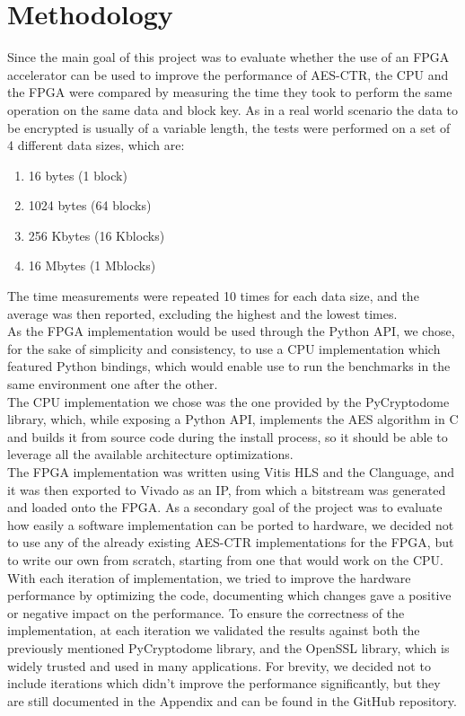 \documentclass[12pt,oneside,a4paper]{article}
\def\CC{{C\nolinebreak[4]\hspace{-.05em}\raisebox{.4ex}{\tiny\bf ++}}}
\begin{document}
\section{Methodology} \label{sec:methodology}
Since the main goal of this project was to evaluate whether the use of an FPGA accelerator can be used to improve the performance of AES-CTR, the CPU and the FPGA were compared by measuring the time they took to perform the same operation on the same data and block key.
As in a real world scenario the data to be encrypted is usually of a variable length, the tests were performed on a set of 4 different data sizes, which are:
\begin{enumerate}
	\item 16 bytes (1 block)
	\item 1024 bytes (64 blocks)
	\item 256 Kbytes (16 Kblocks)
	\item 16 Mbytes (1 Mblocks)
\end{enumerate}
The time measurements were repeated 10 times for each data size, and the average was then reported, excluding the highest and the lowest times.
\\As the FPGA implementation would be used through the Python API, we chose, for the sake of simplicity and consistency, to use a CPU implementation which featured Python bindings, which would enable use to run the benchmarks in the same environment one after the other.
\\The CPU implementation we chose was the one provided by the PyCryptodome library, which, while exposing a Python API, implements the AES algorithm in C and builds it from source code during the install process, so it should be able to leverage all the available architecture optimizations.
\\The FPGA implementation was written using Vitis HLS and the \CC language, and it was then exported to Vivado as an IP, from which a bitstream was generated and loaded onto the FPGA.
As a secondary goal of the project was to evaluate how easily a software implementation can be ported to hardware, we decided not to use any of the already existing AES-CTR implementations for the FPGA, but to write our own from scratch, starting from one that would work on the CPU.
With each iteration of implementation, we tried to improve the hardware performance by optimizing the code, documenting which changes gave a positive or negative impact on the performance.
To ensure the correctness of the implementation, at each iteration we validated the results against both the previously mentioned PyCryptodome library, and the OpenSSL library, which is widely trusted and used in many applications.
For brevity, we decided not to include iterations which didn't improve the performance significantly, but they are still documented in the Appendix and can be found in the GitHub repository.
\end{document}
